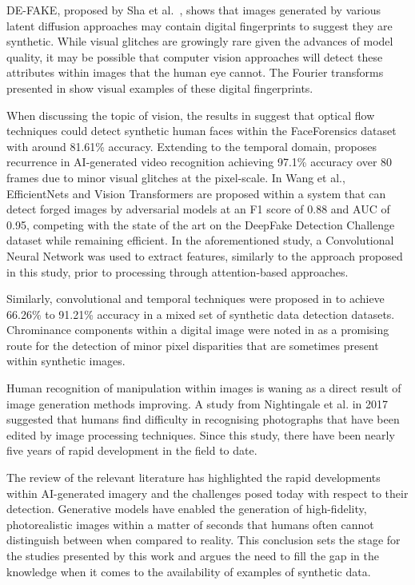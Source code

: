 \documentclass{article}
\begin{document}
DE-FAKE, proposed by Sha et al.~\cite{sha2022fake}, shows that images generated by various latent diffusion approaches may contain digital fingerprints to suggest they are synthetic. While visual glitches are growingly rare given the advances of model quality, it may be possible that computer vision approaches will detect these attributes within images that the human eye cannot. The Fourier transforms presented in \cite{corvi2022detection} show visual examples of these digital fingerprints.

When discussing the topic of vision, the results in \cite{amerini2019deepfake} suggest that optical flow techniques could detect synthetic human faces within the FaceForensics dataset with around 81.61\% accuracy. Extending to the temporal domain, \cite{guera2018deepfake} proposes recurrence in AI-generated video recognition achieving 97.1\% accuracy over 80 frames due to minor visual glitches at the pixel-scale. In Wang et al.\cite{wang2022m2tr}, EfficientNets and Vision Transformers are proposed within a system that can detect forged images by adversarial models at an F1 score of 0.88 and AUC of 0.95, competing with the state of the art on the DeepFake Detection Challenge dataset while remaining efficient. In the aforementioned study, a Convolutional Neural Network was used to extract features, similarly to the approach proposed in this study, prior to processing through attention-based approaches. 

Similarly, convolutional and temporal techniques were proposed in \cite{saikia2022hybrid} to achieve 66.26\% to 91.21\% accuracy in a mixed set of synthetic data detection datasets. Chrominance components  within a digital image were noted in \cite{li2020identification} as a promising route for the detection of minor pixel disparities that are sometimes present within synthetic images.

Human recognition of manipulation within images is waning as a direct result of image generation methods improving. A study from Nightingale et al.\cite{nightingale2017can} in 2017 suggested that humans find difficulty in recognising photographs that have been edited by image processing techniques. Since this study, there have been nearly five years of rapid development in the field to date. 

The review of the relevant literature has highlighted the rapid developments within AI-generated imagery and the challenges posed today with respect to their detection. Generative models have enabled the generation of high-fidelity, photorealistic images within a matter of seconds that humans often cannot distinguish between when compared to reality. This conclusion sets the stage for the studies presented by this work and argues the need to fill the gap in the knowledge when it comes to the availability of examples of synthetic data. 
\end{document}
